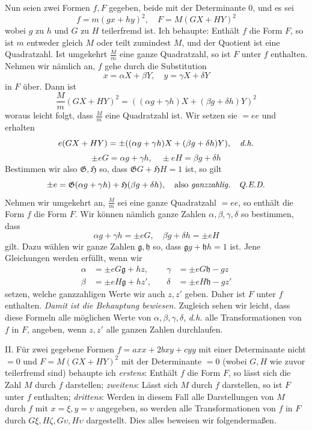 Nun seien zwei Formen $f,F$ gegeben, beide mit der Determinante 0, und es sei
\[
f=m(gx+hy)^2,\quad F=M(GX+HY)^2
\]
wobei $g$ zu $h$ und $G$ zu $H$ teilerfremd ist. Ich behaupte: Enthält $f$ die Form $F$, so ist $m$ entweder gleich $M$ oder teilt zumindest $M$, und der Quotient ist eine Quadratzahl. Ist umgekehrt $\frac{M}{m}$ eine ganze Quadratzahl, so ist $F$ unter $f$ enthalten. Nehmen wir nämlich an, $f$ gehe durch die Substitution
\[
x=\alpha X+\beta Y,\quad y=\gamma X+\delta Y
\]
in $F$ über. Dann ist
\[
\frac{M}{m}(GX+HY)^2=((\alpha g+\gamma h)X+(\beta g+\delta h)Y)^2
\]
woraus leicht folgt, dass $\frac{M}{m}$ eine Quadratzahl ist. Wir setzen sie $=ee$ und erhalten
\[
e(GX+HY)=\pm((\alpha g+\gamma h)X+(\beta g+\delta h)Y),\quad\text{\textit{d.h.}}
\]
\[
\pm eG=\alpha g+\gamma h,\quad\pm eH=\beta g+\delta h
\]
Bestimmen wir also $\mathfrak{G},\mathfrak{H}$ so, dass $\mathfrak{G}G+\mathfrak{H}H=1$ ist, so gilt
\[
\pm e=\mathfrak{G}(\alpha g+\gamma h)+\mathfrak{H}(\beta g+\delta h),\quad\text{also \textit{ganzzahlig.}\quad\textit{Q.E.D.}}
\]
Nehmen wir umgekehrt an, $\frac{M}{m}$ sei eine ganze Quadratzahl $=ee$, so enthält die Form $f$ die Form $F$. Wir können nämlich ganze Zahlen $\alpha,\beta,\gamma,\delta$ so bestimmen, dass
\[
\alpha g+\gamma h=\pm eG,\quad \beta g+\delta h=\pm eH
\]
gilt. Dazu wählen wir ganze Zahlen $\mathfrak{g},\mathfrak{h}$ so, dass $\mathfrak{g}g+\mathfrak{h}h=1$ ist. Jene Gleichungen werden erfüllt, wenn wir
\[
\begin{aligned}
\alpha&=\pm eG\mathfrak{g}+hz, &\quad\gamma&=\pm eG\mathfrak{h}-gz\\
\beta&=\pm eH\mathfrak{g}+hz', &\quad\delta&=\pm eH\mathfrak{h}-gz'
\end{aligned}
\]
setzen, welche ganzzahligen Werte wir auch $z,z'$ geben. Daher ist $F$ unter $f$ enthalten. \textit{Damit ist die Behauptung bewiesen.} Zugleich sehen wir leicht, dass diese Formeln alle möglichen Werte von $\alpha,\beta,\gamma,\delta$, \textit{d.h.} alle Transformationen von $f$ in $F$, angeben, wenn $z,z'$ alle ganzen Zahlen durchlaufen.

II. Für zwei gegebene Formen $f=axx+2bxy+cyy$ mit einer Determinante nicht $=0$ und $F=M(GX+HY)^2$ mit der Determinante $=0$ (wobei $G,H$ wie zuvor teilerfremd sind) behaupte ich \textit{erstens}: Enthält $f$ die Form $F$, so lässt sich die Zahl $M$ durch $f$ darstellen; \textit{zweitens}: Lässt sich $M$ durch $f$ darstellen, so ist $F$ unter $f$ enthalten; \textit{drittens}: Werden in diesem Fall alle Darstellungen von $M$ durch $f$ mit $x=\xi,y=\upsilon$ angegeben, so werden alle Transformationen von $f$ in $F$ durch $G\xi,H\zeta,G\upsilon,H\upsilon$ dargestellt. Dies alles beweisen wir folgendermaßen.

